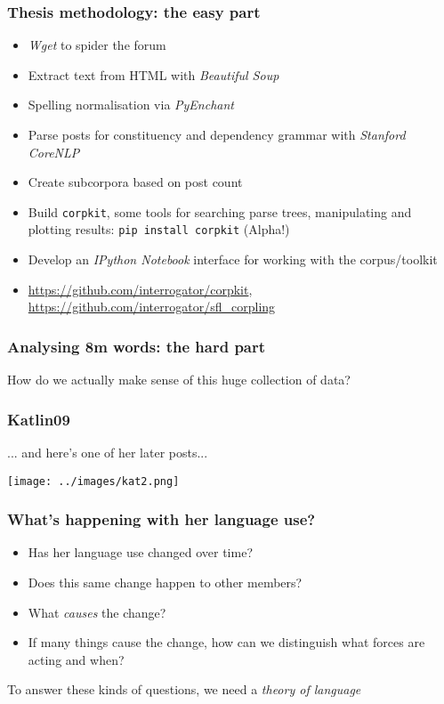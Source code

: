 \documentclass{beamer}       %
\begin{document}
\begin{frame}
 	\frametitle{Thesis methodology: the easy part}
 	
 	\begin{itemize}
 	\item \emph{Wget} to spider the forum
 	\item Extract text from HTML with \emph{Beautiful Soup}
 	\item Spelling normalisation via \emph{PyEnchant} 
 	\item Parse posts for constituency and dependency grammar with \emph{Stanford CoreNLP}
 	\item Create subcorpora based on post count
 	\item Build \texttt{corpkit}, some tools for searching parse trees, manipulating and plotting results: \texttt{pip install corpkit} (Alpha!)
 	\item Develop an \emph{IPython Notebook} interface for working with the corpus\slash toolkit
 	\item \url{https://github.com/interrogator/corpkit}, \url{https://github.com/interrogator/sfl_corpling}
 	\end{itemize}
 \end{frame}


 \begin{frame}
 	\frametitle{Analysing 8m words: the hard part}


 	How do we actually make sense of this huge collection of data?


 \end{frame}
 
 


 \begin{frame}
    \frametitle{Katlin09}
    	
    	... and here's one of her later posts...

        \centering \texttt{[image: ../images/kat2.png]}
  \end{frame}


 \begin{frame}
 	\frametitle{What's happening with her language use?}
 	
 	\begin{itemize}
 	\item Has her language use changed over time?
 	\item Does this same change happen to other members?
 	\item What \emph{causes} the change?
 	\item If many things cause the change, how can we distinguish what forces are acting and when?
 	\end{itemize}

 	To answer these kinds of questions, we need a \emph{theory of language}
 \end{frame}
 
\end{document}
